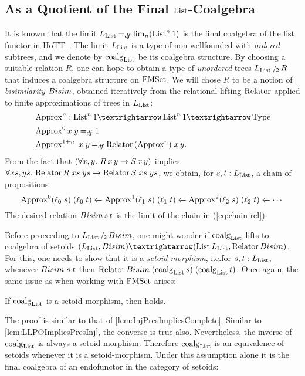 \documentclass[a4paper,USenglish,cleveref]{lipics-v2021}
\begin{document}
\subsection{As a Quotient of the Final $\List$-Coalgebra}\label{sec:final-quotient-set}

It is known that the limit $\Lim{\List} \DefEq \lim_n (\List^n 1)$ is the final coalgebra of the list functor in HoTT~\cite{Ahrens2015}.
The limit $\Lim{\List}$ is a type of non-wellfounded with \emph{ordered} subtrees,
and we denote by $\coalg{\List}$ be its coalgebra structure.
By choosing a suitable relation $R$, one can hope to obtain a type of
\emph{unordered} trees $\SetQuot[\Lim{\List}][R]$ that induces a coalgebra structure on $\FMSet$.
We will chose $R$ to be a notion of \emph{bisimilarity} $\Bisim$,
obtained iteratively from the relational lifting $\Relator$ applied to finite approximations of trees in $\Lim{\List}$:
  \begin{align*}
    &\Approx^n : \List^n 1 → \List^n 1 → \Type \\
    &\Approx^0 x\;y \DefEq 1 \\
    &\Approx^{1+n}\;x\;y \DefEq \Relator \,(\Approx^n)\;x\,y.
  \end{align*}
From the fact that $(\forall x,y\mathpunct{.}\, R \,x\,y \to S \,x\,y)$ implies $\forall xs,ys \Where \Relator  R\;xs\;ys \to \Relator S\;xs\;ys$,
we obtain, for $s, t : \Lim{\List}$, a chain of propositions
\begin{equation}\label{eq:chain-rel}
  \Approx^0 (\ell_0\; s)\; (\ell_0\; t)
    \xleftarrow{} {\Approx^1 (\ell_1\; s)\; (\ell_1\; t)}
    \xleftarrow{} {\Approx^2 (\ell_2\; s)\; (\ell_2\; t)}
    \xleftarrow{} %
      \cdots
\end{equation}
The desired relation $\Bisim\,s\,t$ is the limit of the chain in (\ref{eq:chain-rel}).

Before proceeding to $\SetQuot[\Lim{\List}][\Bisim]$,
one might wonder if $\coalg{\List}$ lifts to coalgebra of setoids $(\Lim{\List}, \Bisim) → (\List \Lim{\List}, \Relator \Bisim)$.
For this, one needs to show that it is a \emph{setoid-morphism},
i.e.\@ for $s, t : \Lim{\List}$, whenever $\Bisim\;s\;t$
then $\Relator \Bisim\; (\coalg{\List} s)\; (\coalg{\List} t)$.
Once again, the same issue as when working with $\FMSet$ arises:

\begin{theorem}
  If $\coalg{\List}$ is a setoid-morphism, then \LLPO{} holds.
\end{theorem}
The proof is similar to that of \cref{lem:InjPresImpliesComplete}.
Similar to \cref{lem:LLPOImpliesPresInj}, the converse is true also.
Nevertheless, the inverse of $\coalg{\List}$ is always a setoid-morphism.
Therefore $\coalg{\List}$ is an equivalence of setoids whenever it is a setoid-morphism.
Under this assumption alone it is the final coalgebra of an endofunctor in the category of setoids:
\end{document}
